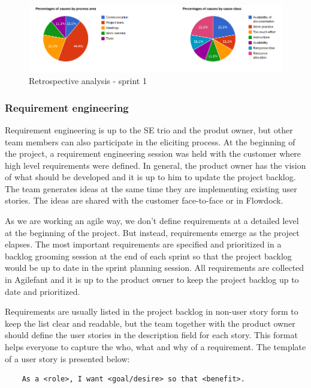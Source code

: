 \begin{figure}[H]
\centering
\includegraphics[width=1\textwidth]{imgs/retro-analysis-sprint1.png}
\caption{Retrospective analysis - sprint 1}
\label{fig:retro1analysis}
\end{figure}

\subsubsection{Requirement engineering}

Requirement engineering is up to the SE trio and the produt owner, but other
team members can also participate in the eliciting process. At the beginning of
the project, a requirement engineering session was held with the customer where
high level requirements were defined. In general, the product owner has the
vision of what should be developed and it is up to him to update the project
backlog. The team generates ideas at the same time they are implementing
existing user stories. The ideas are shared with the customer face-to-face or in
Flowdock.

As we are working an agile way, we don't define requirements at a detailed level
at the beginning of the project. But instead, requirements emerge as the
project elapses. The most important requirements are specified and prioritized
in a backlog grooming session at the end of each sprint so that the project backlog
would be up to date in the sprint planning session. All requirements are
collected in Agilefant and it is up to the product owner to keep the project
backlog up to date and prioritized.

Requirements are usually listed in the project backlog in non-user story form to
keep the list clear and readable, but the team together with the product owner
should define the user stories in the description field for each story. This
format helps everyone to capture the who, what and why of a requirement. The
template of a user story is presented below:

\begin{verbatim}
    As a <role>, I want <goal/desire> so that <benefit>.
\end{verbatim}

